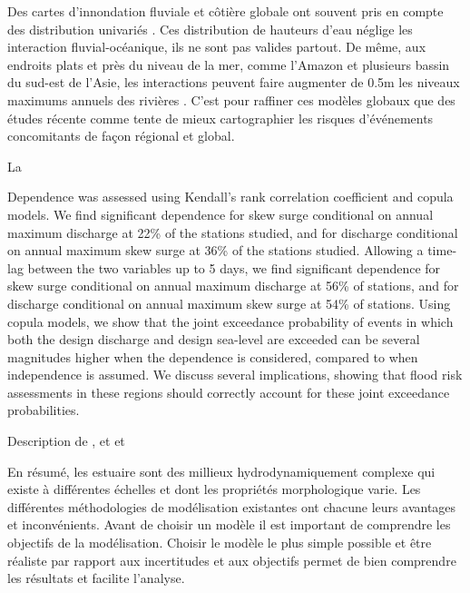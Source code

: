 \documentclass[12pt]{article}   %
\begin{document}
     Des cartes d'innondation fluviale et côtière globale ont souvent pris en compte des distribution univariés \cite{Ward2015}. Ces distribution de hauteurs d'eau néglige les interaction fluvial-océanique, ils ne sont pas valides partout. De même, aux endroits plats et près du niveau de la mer, comme l'Amazon et plusieurs bassin du sud-est de l'Asie, les interactions peuvent faire augmenter de 0.5m les niveaux maximums annuels des rivières \cite{Ikeuchi2017}. C'est pour raffiner ces modèles globaux que des études récente comme \cite{Ward2018,Hendry2019,Wu2018,Couasnon2019} tente de mieux cartographier les risques d'événements concomitants de façon régional et global. 
    
    La 
    
Dependence was assessed using Kendall’s rank correlation coefficient and copula models. We find significant dependence for skew surge conditional on annual maximum
discharge at 22\% of the stations studied, and for discharge conditional on annual maximum skew
surge at 36\% of the stations studied. Allowing a time-lag between the two variables up to 5 days, we
find significant dependence for skew surge conditional on annual maximum discharge at 56\% of
stations, and for discharge conditional on annual maximum skew surge at 54\% of stations. Using
copula models, we show that the joint exceedance probability of events in which both the design
discharge and design sea-level are exceeded can be several magnitudes higher when the dependence is
considered, compared to when independence is assumed. We discuss several implications, showing
that flood risk assessments in these regions should correctly account for these joint exceedance
probabilities.
    
    Description de \cite{Ward2018}, \cite{Wu2018} et \cite{Couasnon2019} et \cite{Hendry2019}
    




    En résumé, les estuaire sont des millieux hydrodynamiquement complexe qui existe à différentes échelles et dont les propriétés morphologique varie. Les différentes méthodologies de modélisation existantes ont chacune leurs avantages et inconvénients. Avant de choisir un modèle il est important de comprendre les objectifs de la modélisation. Choisir le modèle le plus simple possible et être réaliste par rapport aux incertitudes et aux objectifs permet de bien comprendre les résultats et facilite l'analyse.  

    


\printbibliography
\end{document}
